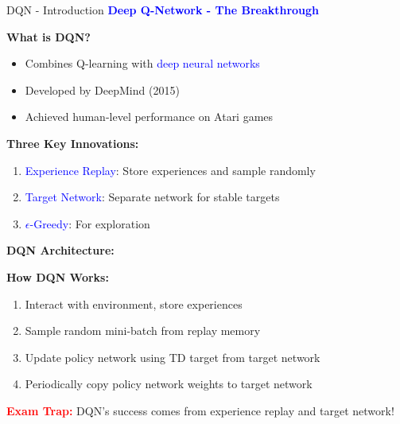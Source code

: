 \documentclass[8pt]{beamer}
\begin{document}
\begin{frame}{DQN - Introduction}
\fontsize{6.5}{7.5}\selectfont
\textcolor{blue}{\textbf{Deep Q-Network - The Breakthrough}}

\textbf{What is DQN?}
\begin{itemize}
\item Combines Q-learning with \textcolor{blue}{deep neural networks}
\item Developed by DeepMind (2015)
\item Achieved human-level performance on Atari games
\end{itemize}

\textbf{Three Key Innovations:}
\begin{enumerate}
\item \textcolor{blue}{Experience Replay}: Store experiences and sample randomly
\item \textcolor{blue}{Target Network}: Separate network for stable targets
\item \textcolor{blue}{$\epsilon$-Greedy}: For exploration
\end{enumerate}

\textbf{DQN Architecture:}
\begin{center}
\end{center}

\textbf{How DQN Works:}
\begin{enumerate}
\item Interact with environment, store experiences
\item Sample random mini-batch from replay memory
\item Update policy network using TD target from target network
\item Periodically copy policy network weights to target network
\end{enumerate}

\textcolor{red}{\textbf{Exam Trap:}} DQN's success comes from experience replay and target network!
\end{frame}
\end{document}
